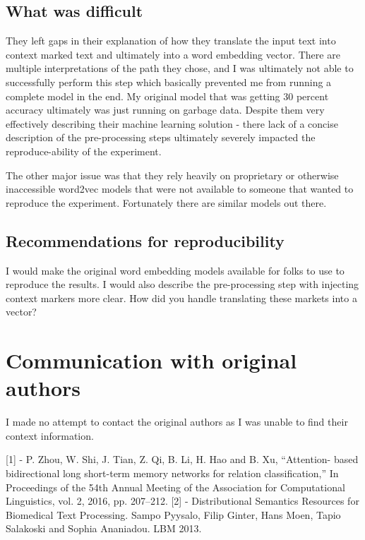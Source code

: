 \documentclass[11pt,a4paper]{article}
\begin{document}
\subsection{What was difficult}
They left gaps in their explanation of how they translate the input text into context marked text and ultimately into a word embedding vector. There are multiple interpretations of the path they chose, and I was ultimately not able to successfully perform this step which basically prevented me from running a complete model in the end. My original model that was getting 30 percent accuracy ultimately was just running on garbage data. Despite them very effectively describing their machine learning solution -
there lack of a concise description of the pre-processing steps ultimately severely impacted the reproduce-ability of the experiment. 

The other major issue was that they rely heavily on proprietary or otherwise inaccessible word2vec models that were not available to someone that wanted to reproduce the experiment. Fortunately there are similar models out there.

\subsection{Recommendations for reproducibility}
I would make the original word embedding models available for folks to use to reproduce the results. I would also describe the pre-processing step with injecting context markers more clear. How did you handle translating these markets into a vector? 

\section{Communication with original authors}
I made no attempt to contact the original authors as I was unable to find their context information.

[1] - P. Zhou, W. Shi, J. Tian, Z. Qi, B. Li, H. Hao and B. Xu, “Attention- based bidirectional long short-term memory networks for relation classification,” In Proceedings of the 54th Annual Meeting of the Association for Computational Linguistics, vol. 2, 2016, pp. 207–212.
[2] - Distributional Semantics Resources for Biomedical Text Processing. Sampo Pyysalo, Filip Ginter, Hans Moen, Tapio Salakoski and Sophia Ananiadou. LBM 2013.




\end{document}

